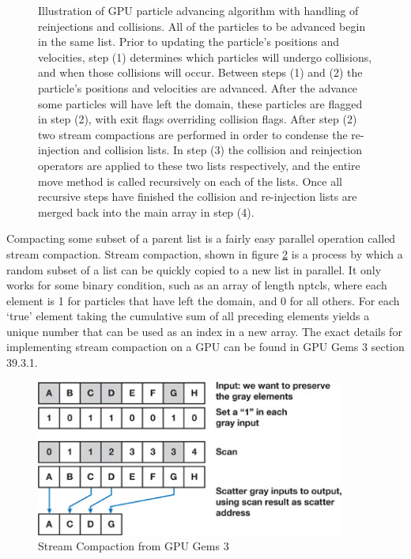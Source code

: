 \begin{figure}
\begin{center}

\end{center}
\caption[Illustration of GPU particle advancing algorithm]{Illustration of GPU particle advancing algorithm with handling of reinjections and collisions. All of the particles to be advanced begin in the same list. Prior to updating the particle's positions and velocities, step (1) determines which particles will undergo collisions, and when those collisions will occur. Between steps (1) and (2) the particle's positions and velocities are advanced. After the advance some particles will have left the domain, these particles are flagged in step (2), with exit flags overriding collision flags. After step (2) two stream compactions are performed in order to condense the re-injection and collision lists. In step (3) the collision and reinjection operators are applied to these two lists respectively, and the entire move method is called recursively on each of the lists. Once all recursive steps have finished the collision and re-injection lists are merged back into the main array in step (4). }
\label{fig:padvnc}
\end{figure}

Compacting some subset of a parent list is a fairly easy parallel operation called stream compaction. Stream compaction, shown in figure \ref{fig:stream_compact} is a process by which a random subset of a list can be quickly copied to a new list in parallel. It only works for some binary condition, such as an array of length nptcls, where each element is 1 for particles that have left the domain, and 0 for all others. For each `true' element taking the cumulative sum of all preceding elements yields a unique number that can be used as an index in a new array. The exact details for implementing stream compaction on a GPU can be found in GPU Gems 3 section 39.3.1.\cite{Harris2007} 

\begin{figure}
\begin{center}
\includegraphics[width=4in]{implementation/stream_compact.jpg}
\end{center}
\caption[Stream Compaction]{Stream Compaction from GPU Gems 3 \cite{Harris2007}}
\label{fig:stream_compact}
\end{figure}



